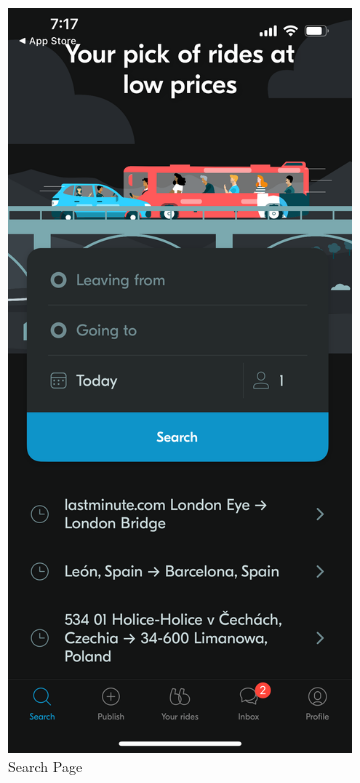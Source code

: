 \documentclass[a4paper, 12pt]{article} %
\begin{document}
                \begin{figure}
                    \centering
                    \begin{subfigure}{0.3\textwidth}
                        \includegraphics[width=0.8\linewidth, height=0.9\textheight, keepaspectratio]{Images/Blablacar_search.PNG}
                        \caption{Search Page}
                        \label{fig:blabla_search}
                    \end{subfigure}
                    \begin{subfigure}{0.3\textwidth}

\end{subfigure}
\end{figure}
\end{document}

